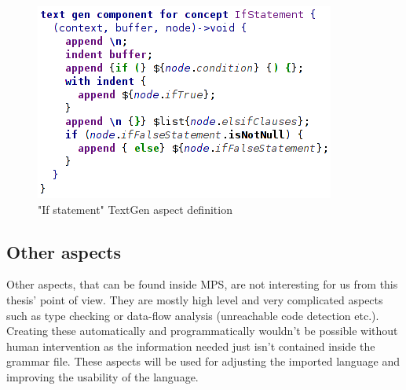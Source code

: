 \begin{figure}[h]
	\centering
	\includegraphics[scale=0.70]{./img/if_statement_textgen.png}
	\caption{"If statement" TextGen aspect definition}
	\label{fig:if_statement_textgen}
\end{figure}

\subsection{Other aspects}
Other aspects, that can be found inside MPS, are not interesting for us from this thesis' point of view.
They are mostly high level and very complicated aspects such as type checking or data-flow analysis (unreachable code detection etc.).
Creating these automatically and programmatically wouldn't be possible without human intervention as the information needed just isn't contained inside the grammar file.
These aspects will be used for adjusting the imported language and improving the usability of the language.